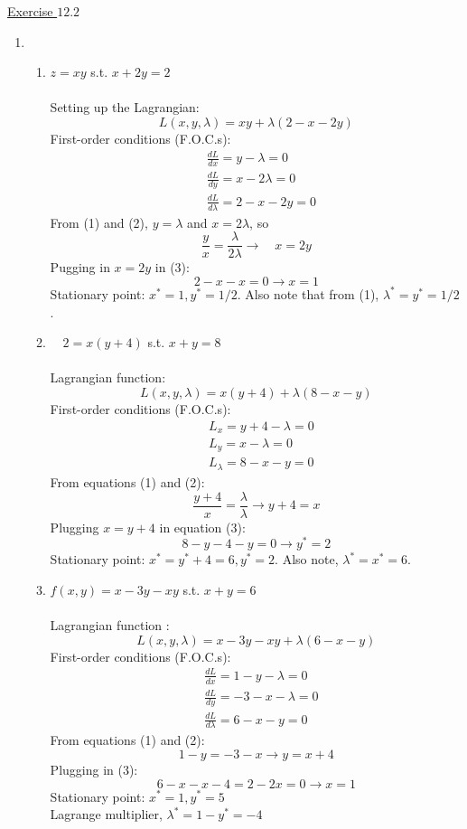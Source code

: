 \documentclass{./../../Latex/homework}
\begin{document}
\thispagestyle{plain}

\underline{Exercise $12.2$} 
\begin{enumerate}

\item 
\begin{enumerate}

\item $z=x y$ s.t. $x+2 y=2$  \\~\\
Setting up the Lagrangian:
$$
L(x, y, \lambda)=x y+\lambda(2-x-2 y)
$$
First-order conditions (F.O.C.s):
\begin{align}
&\frac{d L}{d x}=y-\lambda=0 \\
&\frac{d L}{d y}=x-2 \lambda=0 \\
&\frac{d L}{d \lambda}=2-x-2 y=0
\end{align}
From (1) and (2), $y=\lambda$ and $x=2 \lambda$, so
$$
\frac{y}{x}=\frac{\lambda}{2 \lambda} \rightarrow \quad x=2 y
$$
Pugging in $x=2 y$ in (3):
$$
2-x-x=0 \rightarrow x=1
$$
Stationary point: $x^{*}=1, y^{*}=1/2$. 
Also note that from (1),  $\lambda^{*}=y^{*}=1/2$. \\

\item $\quad 2=x(y+4)$ s.t. $x+y=8$ \\~\\
Lagrangian function:
$$ L(x, y, \lambda)=x(y+4)+\lambda(8-x-y) $$
First-order conditions (F.O.C.s):
\setcounter{equation}{0}
\begin{align}
& L_{x}=y+4-\lambda=0 \\
& L_{y}=x-\lambda=0 \\
& L_{\lambda}=8-x-y=0
\end{align}
From equations (1) and (2):
$$
\frac{y+4}{x}=\frac{\lambda}{\lambda} \rightarrow y+4=x
$$
Plugging $x=y+4$ in equation (3):
$$
8-y-4-y=0 \rightarrow y^{*}=2
$$
Stationary point: $x^{*}=y^{*}+4=6, y^{*}=2$. Also note, $\lambda^{*}=x^{*}=6$. \\

\item $f(x, y)=x-3 y-x y$ s.t. $x+y=6$ \\~\\
Lagrangian function :
$$ L(x, y, \lambda)=x-3 y-x y+\lambda(6-x-y) $$
First-order conditions (F.O.C.s):
\setcounter{equation}{0}
\begin{align}
& \frac{d L}{d x}=1-y-\lambda=0 \\
& \frac{d L}{d y}=-3-x-\lambda=0 \\
& \frac{d L}{d \lambda}=6-x-y=0
\end{align}
From equations (1) and (2):
$$
1-y=-3-x \rightarrow y=x+4
$$
Plugging in (3):
$$
6-x-x-4=2-2 x=0 \rightarrow x=1
$$
Stationary point: $x^{*}=1, y^{*}=5$ \\
Lagrange multiplier, $\lambda^{*}=1-y^{*}=-4$ \\


\end{enumerate}
\end{enumerate}
\end{document}
